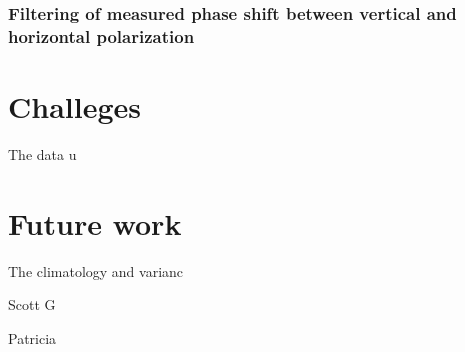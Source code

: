 \documentclass[twocol]{ametsoc}
\begin{document}
\subsubsection{Filtering of measured phase shift between vertical and horizontal polarization}
\cite{giangrande_application_2013}



\section{Challeges}
The data u

\section{Future work}
The climatology and varianc


\acknowledgments{}

Scott G

Patricia

%
%
%
\end{document}
